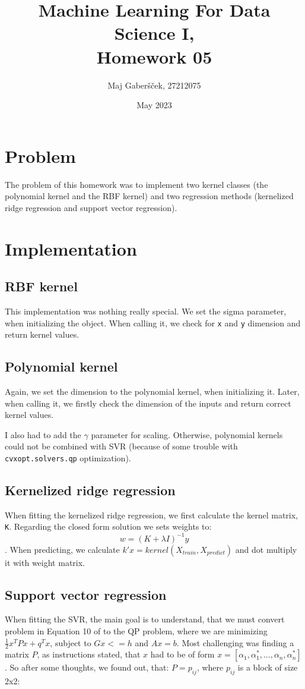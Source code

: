 \documentclass{article}
\title{Machine Learning For Data Science I, \\[0.1cm] Homework 05}
\author{Maj Gaberšček, 27212075}
\date{May 2023}
\begin{document}
\maketitle

\section{Problem}

The problem of this homework was to implement two kernel classes (the polynomial kernel and the RBF kernel) and two regression methods (kernelized ridge regression and support vector regression). 

\section{Implementation}

\subsection{RBF kernel}
This implementation was nothing really special. We set the sigma parameter, when initializing the object. When calling it, we check for \texttt{x} and \texttt{y} dimension and return kernel values.

\subsection{Polynomial kernel}
Again, we set the dimension to the polynomial kernel, when initializing it. Later, when calling it, we firstly check the dimension of the inputs and return correct kernel values.

I also had to add the $\gamma$ parameter for scaling. Otherwise, polynomial kernels could not be combined with SVR (because of some trouble with \texttt{cvxopt.solvers.qp} optimization).

\subsection{Kernelized ridge regression}
When fitting the kernelized ridge regression, we first calculate the kernel matrix, \texttt{K}. Regarding the closed form solution we sets weights to: $$w = (K + \lambda I)^{-1} y$$. When predicting, we calculate $k'x = kernel(X_{train}, X_{predict})$ and dot multiply it with weight matrix.

\subsection{Support vector regression}
When fitting the SVR, the main goal is to understand, that we must convert problem in Equation 10 of \cite{smola2004tutorial} to the QP problem, where we are minimizing $\frac{1}{2} x^T P x + q^T x$, subject to $G x <= h$ and $A x = b$. Most challenging was finding a matrix $P$, as instructions stated, that $x$ had to be of form $x = [\alpha_1, \alpha_1^*,..., \alpha_n, \alpha_n^*]$. So after some thoughts, we found out, that: $P = p_{ij}$, where $p_{ij}$ is a block of size 2x2: 
\end{document}
